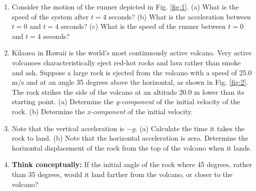 \documentclass{article}
\begin{document}
\begin{enumerate}
\item Consider the motion of the runner depicted in Fig. \ref{fig:1}.  (a) What is the speed of the system after $t = 4$ seconds? (b) What is the acceleration between $t=0$ and $t=4$ seconds? (c) What is the speed of the runner between $t=0$ and $t=4$ seconds? \\ \vspace{3cm}
\item Kilauea in Hawaii is the world's most continuously active volcano. Very active volcanoes characteristically eject red-hot rocks and lava rather than smoke and ash. Suppose a large rock is ejected from the volcano with a speed of 25.0 m/s and at an angle 35 degrees above the horizontal, as shown in Fig. \ref{fig:2}. The rock strikes the side of the volcano at an altitude 20.0 m lower than its starting point. (a) Determine the \textit{y-component} of the initial velocity of the rock.  (b) Determine the \textit{x-component} of the initial velocity. \\ \vspace{2cm}
\item Note that the vertical acceleration is $-g$. (a) Calculate the time it takes the rock to land. (b) Note that the horizontal acceleration is zero.  Determine the horizontal displacement of the rock from the top of the volcano when it lands. \\ \vspace{3.25cm}
\item \textbf{Think conceptually:} If the initial angle of the rock where 45 degrees, rather than 35 degrees, would it land farther from the volcano, or closer to the volcano?
\end{enumerate}
\end{document}

